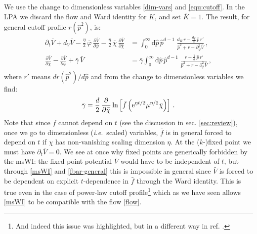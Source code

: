 \documentclass[11pt,draft]{book} %
\newcommand\ie{\textit{i.e.}\ }
\newcommand{\bc}{\bar \chi}
\newcommand{\bV}{\bar V}
\begin{document}
We use the change to dimensionless variables \eqref{dim-vars} and \eqref{equ:cutoff}.
In the LPA we discard the flow and Ward identity for $K$, and set $\bar K=1$.
The result, for general cutoff profile $r(\hat{p}^2)$, is:
\begin{align}
  \label{flow}
  \partial_t \bar V + d_V \bar V - \frac{\eta}{2} \, \bar\varphi \, \frac{\partial \bar V}{\partial \bar\varphi} - \frac{\eta}{2} \, \bar\chi \, \frac{\partial \bar V}{\partial \bar\chi} &=
  \int_0^{\infty} \mathrm d\hat p \, \hat p^{d-1} \; \frac{d_R\, r - \frac{d_V}{d} \, \hat p \, r'}{\hat p^2 + r - \partial^2_{\bar\varphi}\bar V}\,,\\
  \label{msWI}
  \frac{\partial \bar V}{\partial \bar\chi} - \frac{\partial \bar V}{\partial \bar\varphi} + \bar \gamma \, \bar V &= \bar \gamma
  \int_0^{\infty} \mathrm d\hat p \, \hat p^{d-1} \; \frac{r - \frac{1}{d} \, \hat p \, r'}{\hat p^2 + r - \partial^2_{\bar\varphi}\bar V} \,,
\end{align}
where $r'$ means $dr(\hat{p}^2)/d\hat{p}$ and from the change to dimensionless variables we find:
\begin{align}
  \label{fbar-general}
  \bar{\gamma} = \frac{d}{2} \, \frac{\partial}{\partial\bc}\ln
  \left[
    \bar{f}\left({\rm e}^{\eta t/2}\mu^{\eta/2}\bc\right)
  \right]\,.
\end{align}
Note that since $f$ cannot depend on $t$ (see the discussion in sec. \ref{sec:review}),
once we go to dimensionless (\ie scaled) variables, $\bar{f}$ is in general forced to depend on
$t$ if $\chi$ has non-vanishing scaling dimension $\eta$.
At the ($k$-)fixed point we must have $\partial_t \bar V = 0$. We see at once why fixed points are
generically forbidden by the msWI: the fixed point potential $\bar{V}$ would have to be independent of $t$,
but through \eqref{msWI} and \eqref{fbar-general} this is impossible in general since $\bV$ is forced
to be dependent on explicit $t$-dependence in $\bar{f}$ through the Ward identity.
This is true even in the case of power-law cutoff profile\footnote{And indeed this issue was highlighted,
but in a different way in ref. \cite{Dietz:2015owa}.} which as we have seen allows \eqref{msWI} to be
compatible with the flow \eqref{flow}.
\end{document}
